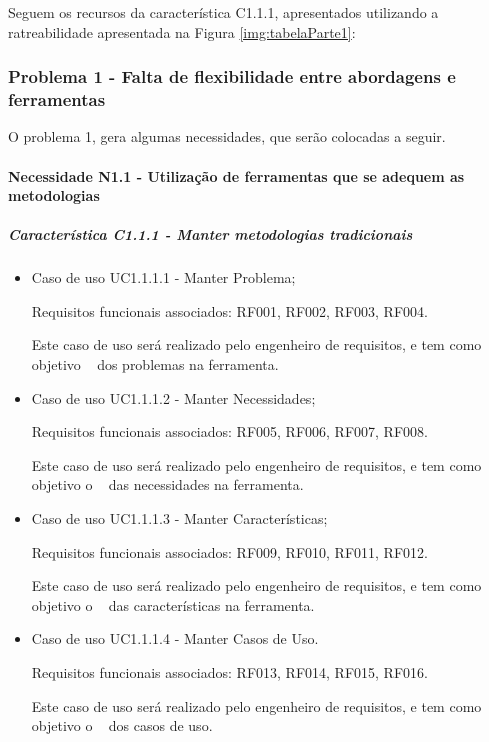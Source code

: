 Seguem os recursos da característica C1.1.1, apresentados utilizando a ratreabilidade apresentada na Figura \ref{img:tabelaParte1}:

\subsubsection{Problema 1 - Falta de flexibilidade entre abordagens e ferramentas}

O problema 1, gera algumas necessidades, que serão colocadas a seguir.

\paragraph{Necessidade N1.1 - Utilização de ferramentas que se adequem as metodologias}

	\subparagraph{Característica C1.1.1 - Manter metodologias tradicionais}
		\begin{itemize}
			
			\item Caso de uso UC1.1.1.1 - Manter Problema;
				
				Requisitos funcionais associados: RF001, RF002, RF003, RF004.

				Este caso de uso será realizado pelo engenheiro de requisitos, e tem como objetivo \CRUD~ dos problemas na ferramenta.
			
			\item Caso de uso UC1.1.1.2 - Manter Necessidades;
				
				Requisitos funcionais associados: RF005, RF006, RF007, RF008.

				Este caso de uso será realizado pelo engenheiro de requisitos, e tem como objetivo o \CRUD~ das necessidades na ferramenta.
			
			\item Caso de uso UC1.1.1.3 - Manter Características;
				
				Requisitos funcionais associados: RF009, RF010, RF011, RF012.

				Este caso de uso será realizado pelo engenheiro de requisitos, e tem como objetivo o \CRUD~ das características na ferramenta.
			
			\item Caso de uso UC1.1.1.4 - Manter Casos de Uso.
				
				Requisitos funcionais associados: RF013, RF014, RF015, RF016.

				Este caso de uso será realizado pelo engenheiro de requisitos, e tem como objetivo o \CRUD~ dos casos de uso.
		\end{itemize}
	
